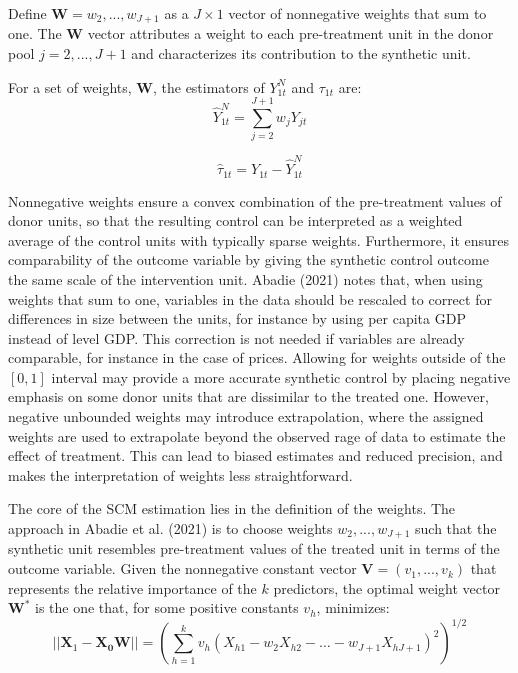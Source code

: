 \documentclass[12pt,a4paper,draft]{article}
\begin{document}
Define $\mathbf{W}=w_2,...,w_{J+1}$ as a $J\times 1$ vector of nonnegative weights
that sum to one. 
The $\mathbf{W}$ vector attributes a weight to each pre-treatment unit in the donor pool 
$j=2,...,J+1$ and characterizes its contribution to the synthetic unit. 

For a set of weights, $\mathbf{W}$, the estimators of $Y_{1t}^N$ and $\tau_{1t}$ are:
\begin{equation}
    \hat{Y}_{1t}^N = \sum_{j=2}^{J+1} {w_jY_{jt}}
\end{equation}

\begin{equation}
    \hat{\tau}_{1t}=Y_{1t}- \hat{Y}_{1t}^N
\end{equation}


Nonnegative weights ensure a convex combination of the pre-treatment values of donor 
units, so that the resulting control can be interpreted as a weighted average 
of the control units with typically sparse weights. 
Furthermore, it ensures comparability of the outcome variable by giving the 
synthetic control outcome the same scale of the intervention unit. 
Abadie (2021) notes that, when using weights that sum to one, variables in the data 
should be rescaled to correct for differences in size between the units, for 
instance by using per capita GDP instead of level GDP. This correction is not 
needed if variables are already comparable, for instance in the case of prices.
Allowing for weights outside of the $[0,1]$ interval may provide a more 
accurate synthetic control by placing negative emphasis on some donor units that 
are dissimilar to the treated one. However, negative unbounded weights may 
introduce extrapolation, where the assigned weights are used to extrapolate 
beyond the observed rage of data to estimate the effect of treatment. 
This can lead to biased estimates and reduced precision, and makes the interpretation 
of weights less straightforward. 

The core of the SCM estimation lies in the definition of the weights. 
The approach in Abadie et al. (2021) is to choose weights $w_2,...,w_{J+1}$ such that 
the synthetic unit resembles pre-treatment values of the treated unit in terms 
of the outcome variable.
Given the nonnegative constant vector $\mathbf{V}=(v_1,...,v_k)$ 
that represents the relative importance of the $k$ predictors, the optimal 
weight vector $\mathbf{W}^*$ is the one that, for some positive constants $v_h$, minimizes:
\begin{equation}
    || \mathbf{X}_1 - \mathbf{X_0} \mathbf{W} || = 
\left( \sum_{h=1}^k {v_h \left( X_{h1}-w_2 X_{h2}-\ldots - w_{J+1} 
X_{hJ+1} \right) ^2} \right)^{1/2}
\end{equation}
\end{document}
